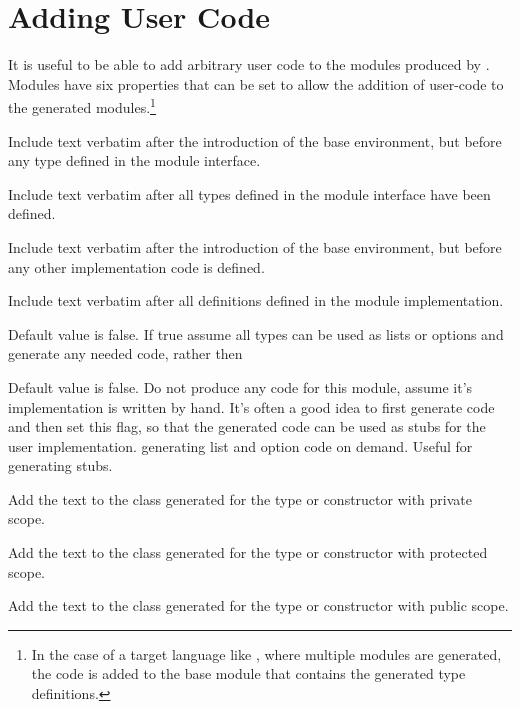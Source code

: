 \section{Adding User Code}
It is useful to be able to add arbitrary user code to the modules
produced by \asdlgen{}.
Modules have six properties that can be set to allow
the addition of user-code to the generated modules.\footnote{
  In the case of a target language like \sml{}, where multiple modules
  are generated, the code is added to the base module that contains the
  generated type definitions.
} 
\begin{description}
    Include text verbatim after the introduction of the base
    environment, but before any type defined in the module interface.

    Include text verbatim after all types defined in the module
    interface have been defined.
	
    Include text verbatim after the introduction of the base
    environment, but before any other implementation code is defined.
	
    Include text verbatim after all definitions defined in the module
    implementation.  

    Default value is false. If true assume all types can be used
    as lists or options and generate any needed code, rather then 

    Default value is false. Do not produce any code for this module, 
    assume it's implementation is 
    written by hand. It's often a good idea to first generate code and then
    set this flag, so that the generated code can be used as stubs for the 
    user implementation.
    generating list and option code on demand. Useful for generating stubs.

    Add the text to the class generated for the type or constructor with private scope.
  
    Add the text to the class generated for the type or constructor with protected scope.
  
     Add the text to the class generated for the type or constructor with public scope.
 
\end{description}%

